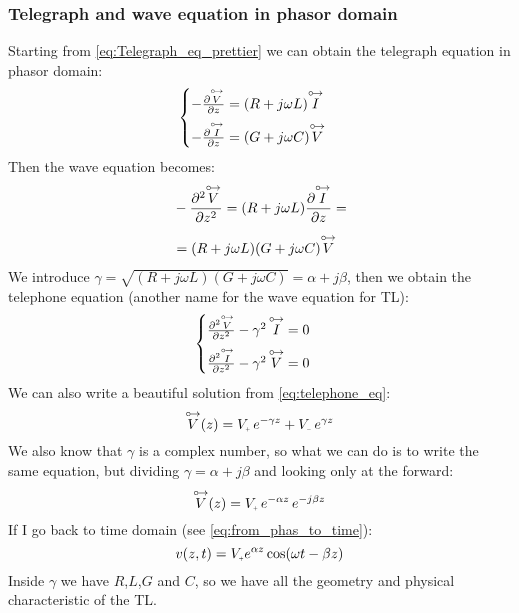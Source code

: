 \subsubsection*{Telegraph and wave equation in phasor domain}
Starting from \cref{eq:Telegraph_eq_prettier} we can obtain the telegraph equation in phasor domain:
\begin{equation}
  \begin{cases}\label{eq:telegraph_in_phas_1}
  -\frac{\partial \overset{\mathbin {{\circ \mkern-2.5mu\rightarrow}}}{V}}{\partial z}=(R+j\omega L)\overset{\mathbin {{\circ \mkern-2.5mu\rightarrow}}}{I}\\[5pt]
  -\frac{\partial \overset{\mathbin {{\circ \mkern-2.5mu\rightarrow}}}{I}}{\partial z}=(G+j\omega C)\overset{\mathbin {{\circ \mkern-2.5mu\rightarrow}}}{V}
  \end{cases}
\end{equation}
Then the wave equation becomes:
\begin{align}
  \begin{split}
    &-\frac{\partial^2 \overset{\mathbin {{\circ \mkern-2.5mu\rightarrow}}}{V}}{\partial z^2}=(R+j\omega L)\frac{\partial \overset{\mathbin {{\circ \mkern-2.5mu\rightarrow}}}{I}}{\partial z}=\\[5pt]
    &=(R+j\omega L)(G+j\omega C)\overset{\mathbin {{\circ \mkern-2.5mu\rightarrow}}}{V}
  \end{split}
\end{align}
We introduce $\gamma = \sqrt{(R+j\omega L)(G+j\omega C)}=\alpha+j\beta$, then we obtain the telephone equation (another name for the wave equation for TL):
\begin{equation}
  \begin{cases}
  \frac{\partial^2 \overset{\mathbin {{\circ \mkern-2.5mu\rightarrow}}}{V}}{\partial z^2}-\gamma^2\,\overset{\mathbin {{\circ \mkern-2.5mu\rightarrow}}}{I}=0\\[5pt]
  \frac{\partial^2 \overset{\mathbin {{\circ \mkern-2.5mu\rightarrow}}}{I}}{\partial z^2}-\gamma^2\,\overset{\mathbin {{\circ \mkern-2.5mu\rightarrow}}}{V}=0
  \end{cases}\label{eq:telephone_eq}
\end{equation}
We can also write a beautiful solution from \cref{eq:telephone_eq}:
\begin{equation}\label{eq:voltage_in_phas_domain}
  \phas{V}(z)=V\bottomPlus \,e^{-\gamma z}+V\bottomMinus \,e^{\gamma z}
\end{equation}
We also know that $\gamma$ is a complex number, so what we can do is to write the same equation, but dividing $\gamma = \alpha+j\beta$ and looking only at the forward:
\begin{equation}
  \phas{V}(z)=V\bottomPlus \,e^{-\alpha z}\,e^{-j\beta z}
\end{equation}
If I go back to time domain (see \cref{eq:from_phas_to_time}):
\begin{equation}\label{eq:from_phas_to_time_TL}
  v(z,t)=V\bottomPlus e^{\alpha z}\cos(\omega t-\beta z)
\end{equation}
Inside $\gamma $ we have $R$,$L$,$G$ and $C$, so we have all the geometry and physical characteristic of the TL.
